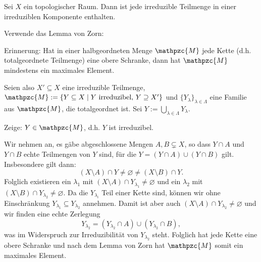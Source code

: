 \documentclass[a4paper,12pt]{scrbook}
\makeatletter
\theoremstyle{blah}
\theoremstyle{stz}
\renewcommand{\proofname}{Beweis}
\renewenvironment{proof}[1][\proofname]{\par
  \pushQED{\qed}%
  \normalfont \topsep6\p@\@plus6\p@\relax
  \trivlist
  \item[\hskip\labelsep
        \itshape
    #1\@addpunct{:}]\ignorespaces
}{%
  \popQED\endtrivlist\@endpefalse
}
\def\M{\mathpzc{M}}
\newcommand{\leer}{\ensuremath{\varnothing}}
\makeatother
\begin{document}
\begin{prop}\label{1.2.10} Sei $X$ ein topologischer Raum. Dann ist jede irreduzible Teilmenge in einer irreduziblen Komponente enthalten.\end{prop}
\begin{proof} Verwende das Lemma von Zorn:

{\sc Erinnerung:} Hat in einer halbgeordneten Menge $\M$ jede Kette (d.h. totalgeordnete Teilmenge) eine obere Schranke, dann hat $\M$ mindestens ein maximales Element.

Seien also $X'\subseteq X$ eine irreduzible Teilmenge, $\M:=\{Y\subseteq X\mid Y\text{ irreduzibel, }Y\supseteq X'\}$ und $\{Y_{\lambda}\}_{\lambda\in\Lambda}$ eine Familie aus $\M$, die totalgeordnet ist. Sei $\displaystyle Y:=\bigcup_{\lambda\in\Lambda}Y_{\lambda}$.

{\sc Zeige:} $Y\in\M$, d.h. $Y$ ist irreduzibel.

Wir nehmen an, es gäbe abgeschlossene Mengen $A,B\subsetneq X$, so dass $Y\cap A$ und $Y\cap B$ echte Teilmengen von $Y$ sind, für die $Y=(Y\cap A)\cup(Y\cap B)$ gilt. Insbesondere gilt dann:
\[(X\setminus A)\cap Y\neq\leer\neq (X\setminus B)\cap Y.\]
Folglich existieren ein $\lambda_{1}$ mit $(X\setminus A)\cap Y_{\lambda_{1}}\neq\leer$ und ein $\lambda_{2}$ mit $(X\setminus B)\cap Y_{\lambda_{2}}\neq\leer$. Da die $Y_{\lambda_{i}}$ Teil einer Kette sind, können wir ohne Einschränkung $Y_{\lambda_{1}}\subseteq Y_{\lambda_{2}}$ annehmen. Damit ist aber auch $(X\setminus A)\cap Y_{\lambda_{2}}\neq\leer$ und wir finden eine echte Zerlegung
\[Y_{\lambda_{2}}=(Y_{\lambda_{2}}\cap A)\cup(Y_{\lambda_{2}}\cap B),\]
was im Widerspruch zur Irreduzibilität von $Y_{\lambda_{2}}$ steht. Folglich hat jede Kette eine obere Schranke und nach dem Lemma von Zorn hat $\M$ somit ein maximales Element.
\end{proof}
\end{document}

